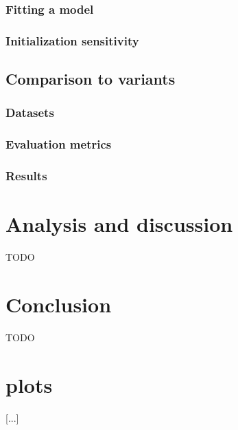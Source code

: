 \documentclass[10pt]{article}
\begin{document}
\subsubsection{Fitting a model}

\subsubsection{Initialization sensitivity}


\subsection{Comparison to variants}

\subsubsection{Datasets}

\subsubsection{Evaluation metrics}

\subsubsection{Results}


\section{Analysis and discussion}
\label{sec:discussion}

TODO



\section{Conclusion}
\label{sec:conclusion}

TODO




\newpage

\appendix
\section{plots}

 [...]



\end{document}
